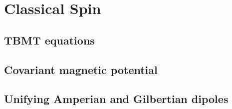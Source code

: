\section{Classical Spin}\label{sec:cspin}
\subsection{TBMT equations}
\subsection{Covariant magnetic potential}
\subsection{Unifying Amperian and Gilbertian dipoles}